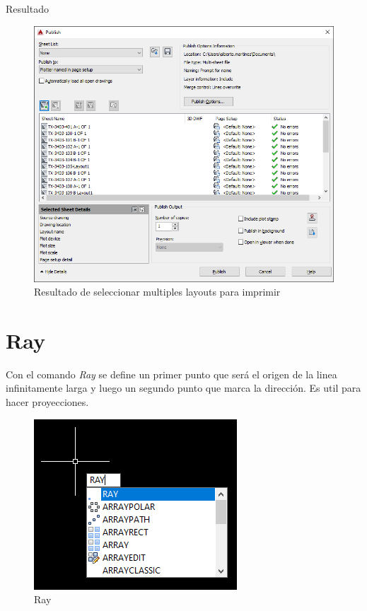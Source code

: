 \documentclass{report}
\begin{document}
{\LARGE Resultado}

\begin{figure}[H]
	\centering
	\includegraphics[width=0.85\linewidth, height=0.5\textheight,keepaspectratio]{Imagenes/autocad_publish_04}
	\caption{Resultado de seleccionar multiples layouts para imprimir}
	\label{fig:autocadpublish04}
\end{figure}


\chapter{Ray}

Con el comando \emph{Ray} se define un primer punto que será el origen de la linea infinitamente larga y luego un segundo punto que marca la dirección. Es util para hacer proyecciones.

\begin{figure}[H]
	\centering
	\includegraphics[width=0.65\linewidth, height=0.5\textheight,keepaspectratio]{Imagenes/autocad_ray01}
	\caption{Ray}
	\label{fig:autocadray01}
\end{figure}
\end{document}
